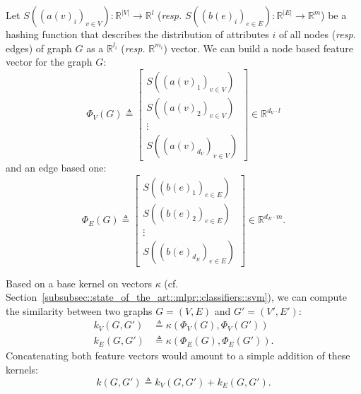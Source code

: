             Let $S\left(\left(a(v)_i\right)_{v\in V}\right): \mathbb{R}^{\vert V\vert} \rightarrow \mathbb{R}^l$ (\textit{resp.} $S\left(\left(b(e)_i\right)_{e\in E}\right): \mathbb{R}^{\vert E\vert} \rightarrow \mathbb{R}^{m}$) be a hashing function that describes the distribution of attributes $i$ of all nodes (\textit{resp.} edges) of graph $G$ as a $\mathbb{R}^{l_i}$ (\textit{resp.} $\mathbb{R}^{m_i}$) vector.
            We can build a node based feature vector for the graph $G$:
            \begin{equation}
                \label{eq::feature_node_graph}
                \Phi_V(G) \triangleq \begin{bmatrix}
                    S\left(\left(a(v)_1\right)_{v\in V}\right)\\
                    S\left(\left(a(v)_2\right)_{v\in V}\right)\\
                    \vdots\\
                    S\left(\left(a(v)_{d_V}\right)_{v\in V}\right)
                \end{bmatrix} \in \mathbb{R}^{d_V \cdot l}
            \end{equation}
            and an edge based one:
            \begin{equation}
                \label{eq::feature_edge_graph}
                \Phi_E(G) \triangleq \begin{bmatrix}
                    S\left(\left(b(e)_1\right)_{e \in E}\right)\\
                    S\left(\left(b(e)_2\right)_{e \in E}\right)\\
                    \vdots\\
                    S\left(\left(b(e)_{d_E}\right)_{e \in E}\right)
                \end{bmatrix} \in \mathbb{R}^{d_E \cdot m}.
            \end{equation}

            Based on a base kernel on vectors $\kappa$ (cf. Section~\ref{subsubsec::state_of_the_art::mlpr::classifiers::svm}), we can compute the similarity between two graphs $G = \left(V, E\right)$ and $G' = \left(V', E'\right)$:
            \begin{align}
                \label{eq::feature_graph_kernel_nodes}
                k_V(G, G') &\triangleq \kappa(\Phi_V(G), \Phi_V(G'))\\
                \label{eq::feature_graph_kernel_edges}
                k_E(G, G') &\triangleq \kappa(\Phi_E(G), \Phi_E(G')).
            \end{align}
            Concatenating both feature vectors would amount to a simple addition of these kernels:
            \begin{equation}
                \label{eq::feature_graph_kernel_sum}
                k(G, G') \triangleq k_V(G, G') + k_E(G, G').
            \end{equation}

